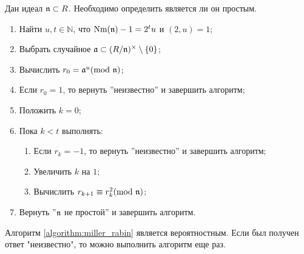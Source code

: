 \documentclass[_dissertation.tex]{subfiles}
\begin{document}
\begin{algorithm}\label{algorithm:miller_rabin}
    Дан идеал $\mathfrak{n} \subset R$.
    Необходимо определить является ли он простым.

    \begin{enumerate}
        \item Найти $u, t \in \mathbb{N}$, что $\textrm{Nm}(\mathfrak{n}) - 1 = 2^t u$ и $(2, u) = 1$;
        
        \item Выбрать случайное $\mathfrak{a} \subset (R/\mathfrak{n})^{\times}\setminus\{0\}$;

        \item Вычислить $r_0 = \mathfrak{a}^u (\textrm{mod } \mathfrak{n})$;

        \item Если $r_0 = 1$, то вернуть ''неизвестно'' и завершить алгоритм;

        \item Положить $k = 0$;

        \item Пока $k < t$ выполнять:
        \begin{enumerate}
            \item Если $r_k = -1$, то вернуть ''неизвестно'' и завершить алгоритм;

            \item Увеличить $k$ на $1$;

            \item Вычислить $r_{k+1} \equiv r_k^2 (\textrm{mod } \mathfrak{n})$;
        \end{enumerate}

        \item Вернуть ''$\mathfrak{n}$ не простой'' и завершить алгоритм.
    \end{enumerate}
\end{algorithm}

\begin{remark}
    Алгоритм \ref{algorithm:miller_rabin} является вероятностным.
    Если был получен ответ "неизвестно", то можно выполнить алгоритм еще раз.
\end{remark}
\end{document}
